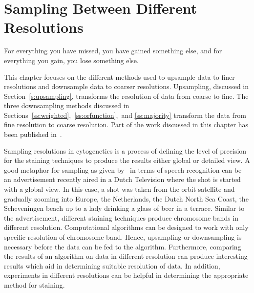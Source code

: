 \chapter{Sampling Between Different Resolutions}
\label{ch:sampling}

\begin{fquote} For everything you have missed, you have gained something else, and for everything you gain, you lose something else.  \end{fquote}
\begin{synopsis}
This chapter focuses on the different methods used to upsample data to finer resolutions and downsample data to coarser resolutions. Upsampling, discussed in Section~\ref{s:upsampling}, transforms the resolution of data from coarse to fine. The three downsampling methods discussed in Sections~\ref{ss:weighted},~\ref{ss:orfunction},~and \ref{ss:majority} transform the data from fine resolution to coarse resolution. Part of the work discussed in this chapter has been published in~\cite{premup}.
\end{synopsis}

Sampling resolutions in cytogenetics is a process of defining the level of precision for the staining techniques to produce the results either global or detailed view. A good metaphor for sampling as given by~\cite{scaling} in terms of speech recognition can be an advertisement recently aired in a Dutch Television where the shot is started with a global view. In this case, a shot was taken from the orbit satellite and gradually zooming into Europe, the Netherlands, the Dutch North Sea Coast, the Scheveningen beach up to a lady drinking a glass of beer in a terrace. Similar to the advertisement, different staining techniques produce chromosome bands in different resolution. Computational algorithms can be designed to work with only specific resolution of chromosome band. Hence, upsampling or downsampling is necessary before the data can be fed to the algorithm. Furthermore, comparing the results of an algorithm on data in different resolution can produce interesting results which aid in determining suitable resolution of data. In addition, experiments in different resolutions can be helpful in determining the appropriate method for staining.

